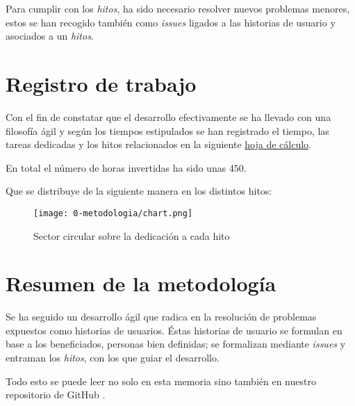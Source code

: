 Para cumplir con los \textit{hitos},  ha sido necesario resolver nuevos  problemas menores, estos se han
recogido también como \textit{issues} ligados a las historias de usuario y asociados a un  \textit{hitos}.

\section{Registro de trabajo}  

Con el fin de constatar que el desarrollo efectivamente se ha 
llevado con una filosofía ágil y según los tiempos estipulados se han registrado el tiempo,
 las tareas dedicadas  y los hitos relacionados
en la siguiente \href{https://docs.google.com/spreadsheets/d/1TCcKQIKjKW9sMSU2f6obN9gHgv3c8UEdjmONkBlv42M/edit?usp=sharing}{hoja de cálculo}.

En total el número de horas invertidas ha sido
unas $450$.

Que se distribuye de la siguiente manera en los distintos hitos: 

\begin{figure}[H]
    \centering
     \texttt{[image: 0-metodologia/chart.png]}
     \caption{Sector circular sobre la dedicación a cada hito}
     \label{img:dedicar-hito}
    \end{figure}

\section{Resumen de la metodología}  

Se ha seguido un desarrollo ágil que radica en la resolución de problemas expuestos como historias de usuarios. 
Éstas historias de usuario se formulan en base a los beneficiados, personas bien definidas; se formalizan 
mediante \textit{issues} y entraman los \textit{hitos}, con los que guiar el desarrollo.

Todo esto se puede leer no solo en esta memoria sino también en nuestro repositorio de GitHub \cite{TFG-Estudio-de-las-redes-neuronales}. 
 




